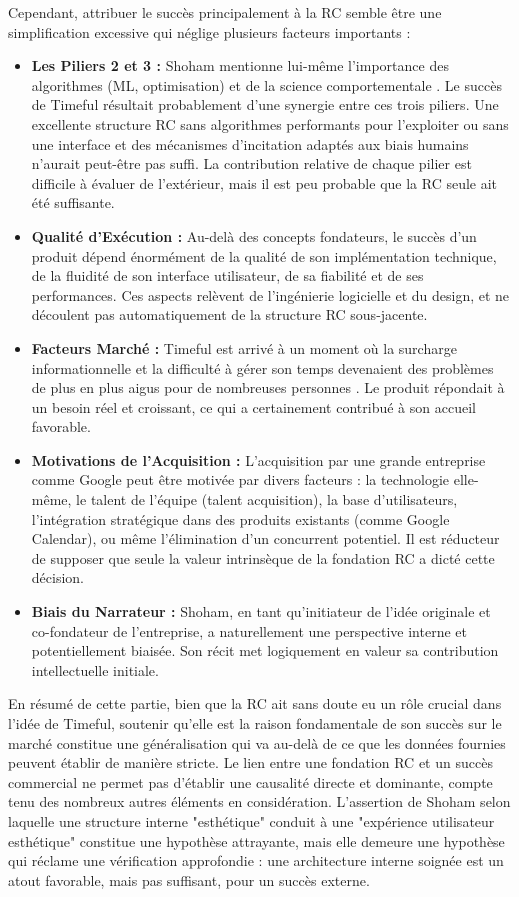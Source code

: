 \documentclass[11pt,a4paper]{article}
\begin{document}
Cependant, attribuer le succès principalement à la RC semble être une simplification excessive qui néglige plusieurs facteurs importants :
\begin{itemize}
    \item \textbf{Les Piliers 2 et 3 :} Shoham mentionne lui-même l'importance des algorithmes (ML, optimisation) et de la science comportementale \citep{Shoham2015Why}. Le succès de Timeful résultait probablement d'une synergie entre ces trois piliers. Une excellente structure RC sans algorithmes performants pour l'exploiter ou sans une interface et des mécanismes d'incitation adaptés aux biais humains n'aurait peut-être pas suffi. La contribution relative de chaque pilier est difficile à évaluer de l'extérieur, mais il est peu probable que la RC seule ait été suffisante.
    \item \textbf{Qualité d'Exécution :} Au-delà des concepts fondateurs, le succès d'un produit dépend énormément de la qualité de son implémentation technique, de la fluidité de son interface utilisateur, de sa fiabilité et de ses performances. Ces aspects relèvent de l'ingénierie logicielle et du design, et ne découlent pas automatiquement de la structure RC sous-jacente.
    \item \textbf{Facteurs Marché :} Timeful est arrivé à un moment où la surcharge informationnelle et la difficulté à gérer son temps devenaient des problèmes de plus en plus aigus pour de nombreuses personnes \citep{Shoham2015Why}. Le produit répondait à un besoin réel et croissant, ce qui a certainement contribué à son accueil favorable.
    \item \textbf{Motivations de l'Acquisition :} L'acquisition par une grande entreprise comme Google peut être motivée par divers facteurs : la technologie elle-même, le talent de l'équipe (talent acquisition), la base d'utilisateurs, l'intégration stratégique dans des produits existants (comme Google Calendar), ou même l'élimination d'un concurrent potentiel. Il est réducteur de supposer que seule la valeur intrinsèque de la fondation RC a dicté cette décision.
    \item \textbf{Biais du Narrateur :} Shoham, en tant qu'initiateur de l'idée originale et co-fondateur de l'entreprise, a naturellement une perspective interne et potentiellement biaisée. Son récit met logiquement en valeur sa contribution intellectuelle initiale.
\end{itemize}

En résumé de cette partie, bien que la RC ait sans doute eu un rôle crucial dans l'idée de Timeful, soutenir qu'elle est la raison fondamentale de son succès sur le marché constitue une généralisation qui va au-delà de ce que les données fournies peuvent établir de manière stricte. Le lien entre une fondation RC et un succès commercial ne permet pas d'établir une causalité directe et dominante, compte tenu des nombreux autres éléments en considération. L'assertion de Shoham selon laquelle une structure interne "esthétique" conduit à une "expérience utilisateur esthétique" \citep{Shoham2015Why} constitue une hypothèse attrayante, mais elle demeure une hypothèse qui réclame une vérification approfondie : une architecture interne soignée est un atout favorable, mais pas suffisant, pour un succès externe. 
\end{document}

